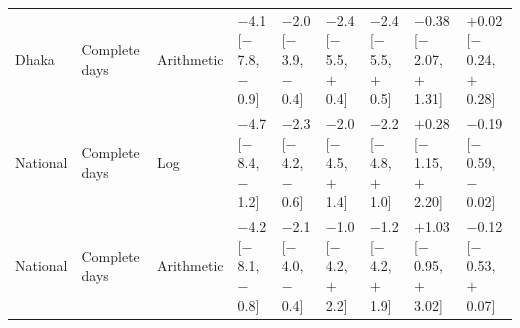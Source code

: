 \begin{longtable}{L{1.2cm} L{1.1cm} L{1.4cm} C{1.75cm} C{1.75cm} C{1.75cm} C{1.75cm} C{1.75cm} C{1.75cm}}
Dhaka & Complete days & Arithmetic & $-$4.1 {\scriptsize[$-$7.8, $-$0.9]} & $-$2.0 {\scriptsize[$-$3.9, $-$0.4]} & $-$2.4 {\scriptsize[$-$5.5, $+$0.4]} & $-$2.4 {\scriptsize[$-$5.5, $+$0.5]} & $-$0.38 {\scriptsize[$-$2.07, $+$1.31]} & $+$0.02 {\scriptsize[$-$0.24, $+$0.28]} \\
National & Complete days & Log & $-$4.7 {\scriptsize[$-$8.4, $-$1.2]} & $-$2.3 {\scriptsize[$-$4.2, $-$0.6]} & $-$2.0 {\scriptsize[$-$4.5, $+$1.4]} & $-$2.2 {\scriptsize[$-$4.8, $+$1.0]} & $+$0.28 {\scriptsize[$-$1.15, $+$2.20]} & $-$0.19 {\scriptsize[$-$0.59, $-$0.02]} \\
National & Complete days & Arithmetic & $-$4.2 {\scriptsize[$-$8.1, $-$0.8]} & $-$2.1 {\scriptsize[$-$4.0, $-$0.4]} & $-$1.0 {\scriptsize[$-$4.2, $+$2.2]} & $-$1.2 {\scriptsize[$-$4.2, $+$1.9]} & $+$1.03 {\scriptsize[$-$0.95, $+$3.02]} & $-$0.12 {\scriptsize[$-$0.53, $+$0.07]} \\
\end{longtable}
\endgroup
